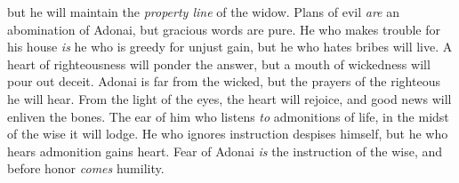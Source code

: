\begin{biblechapter}
but he will maintain the \textit{property line} of the widow.
\verse Plans of evil \textit{are} an abomination of Adonai, 
but gracious words are pure.
\verse He who makes trouble for his house \textit{is} he who is greedy for unjust gain, 
but he who hates bribes will live.
\verse A heart of righteousness will ponder the answer, 
but a mouth of wickedness will pour out deceit.
\verse Adonai is far from the wicked, 
but the prayers of the righteous he will hear.
\verse From the light of the eyes, the heart will rejoice, 
and good news will enliven the bones.
\verse The ear of him who listens \textit{to} admonitions of life, 
in the midst of the wise it will lodge.
\verse He who ignores instruction despises himself, 
but he who hears admonition gains heart.
\verse Fear of Adonai \textit{is} the instruction of the wise, 
and before honor \textit{comes} humility.
\end{biblechapter}

